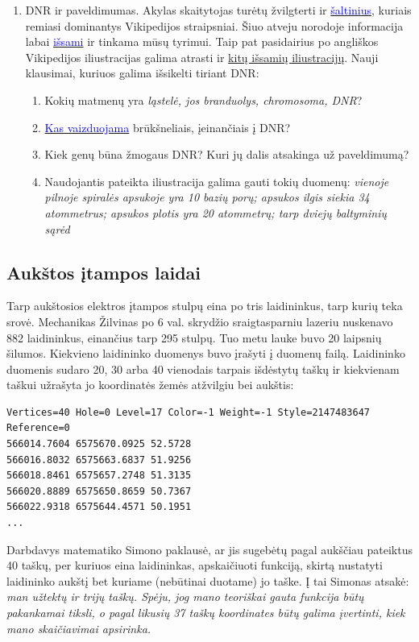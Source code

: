 \documentclass[a4paper]{article}
\begin{document}
\begin{enumerate}
\item DNR ir paveldimumas. Akylas skaitytojas turėtų žvilgterti ir \href{https://lt.wikipedia.org/wiki/Deoksiribonukleorūgštis#Nuorodos}{\textcolor{blue}{šaltinius}}, kuriais remiasi dominantys Vikipedijos straipsniai. Šiuo atveju norodoje informacija labai \href{http://www.johnkyrk.com/chromosomestructure.lit.html}{\textcolor{blue}{išsami}} ir tinkama mūsų tyrimui. Taip pat pasidairius po angliškos Vikipedijos iliustracijas galima atrasti ir \href{https://en.wikipedia.org/wiki/DNA#Biological\_functions}{kitų išsamių iliustracijų}. Nauji klausimai, kuriuos galima išsikelti tiriant DNR:
\begin{enumerate}
\item Kokių matmenų yra \textit{ląstelė, jos branduolys, chromosoma, DNR}?
\item \href{https://lt.wikipedia.org/wiki/Genas}{\textcolor{blue}{Kas vaizduojama}} brūkšneliais, įeinančiais į DNR? 
\item Kiek genų būna žmogaus DNR? Kuri jų dalis atsakinga už paveldimumą? 
\item Naudojantis pateikta iliustracija galima gauti tokių duomenų: \textit{vienoje pilnoje spiralės apsukoje yra 10 bazių porų; apsukos ilgis siekia 34 atommetrus; apsukos plotis yra 20 atommetrų; tarp dviejų baltyminių sąrėd}
\end{enumerate}
\end{enumerate} 

\subsection{Aukštos įtampos laidai}
Tarp aukštosios elektros įtampos stulpų eina po tris laidininkus, tarp kurių teka srovė. Mechanikas Žilvinas po 6 val. skrydžio sraigtasparniu lazeriu nuskenavo 882 laidininkus, einančius tarp 295 stulpų. Tuo metu lauke buvo 20 laipsnių šilumos. Kiekvieno laidininko duomenys buvo įrašyti į duomenų failą. Laidininko duomenis sudaro 20, 30 arba 40 vienodais tarpais išdėstytų taškų ir kiekvienam taškui užrašyta jo koordinatės žemės atžvilgiu bei aukštis:

\begin{verbatim}
Vertices=40 Hole=0 Level=17 Color=-1 Weight=-1 Style=2147483647 Reference=0
566014.7604 6575670.0925 52.5728
566016.8032 6575663.6837 51.9256
566018.8461 6575657.2748 51.3135
566020.8889 6575650.8659 50.7367
566022.9318 6575644.4571 50.1951
...
\end{verbatim}

Darbdavys matematiko Simono paklausė, ar jis sugebėtų pagal aukščiau pateiktus 40 taškų, per kuriuos eina laidininkas, apskaičiuoti funkciją, skirtą nustatyti laidininko aukštį bet kuriame (nebūtinai duotame) jo taške. Į tai Simonas atsakė: \textit{man užtektų ir trijų taškų. Spėju, jog mano teoriškai gauta funkcija būtų pakankamai tiksli, o pagal likusių 37 taškų koordinates būtų galima įvertinti, kiek mano skaičiavimai apsirinka.}
\end{document}

